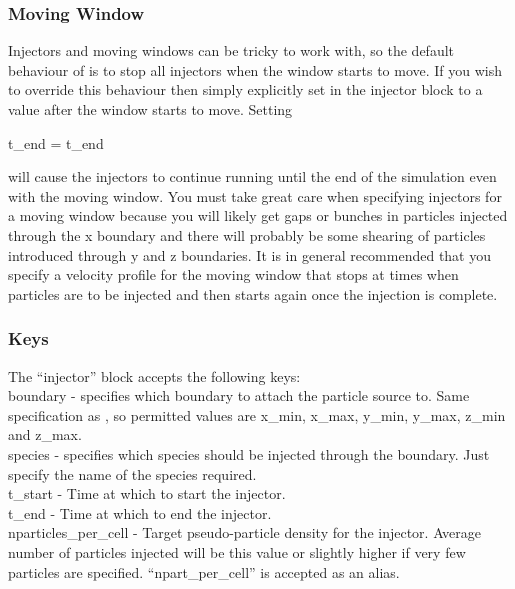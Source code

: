 \subsubsection{Moving Window}

Injectors and moving windows can be tricky to work with, so the default
behaviour of {\EPOCH} is to stop all injectors when the window starts to move.
If you wish to override this behaviour then simply explicitly set
 in the injector block to a value after the window starts
to move. Setting
\begin{boxverbatim}
t_end = t_end
\end{boxverbatim}
will cause the injectors to continue running until the end of the simulation
even with the moving window. You must take great care when specifying injectors
for a moving window because you will likely get gaps or bunches in particles
injected through the x boundary and there will probably be some shearing of
particles introduced through y and z boundaries. It is in general recommended
that you specify a velocity profile for the moving window that stops at times
when particles are to be injected and then starts again once the injection is
complete.

\subsubsection{Keys}

The ``injector'' block accepts the following keys:\\

{\emphtext boundary} - specifies which boundary to attach the particle source
  to. Same specification as , so permitted values are
  x\_min, x\_max, y\_min, y\_max, z\_min and z\_max.\\

{\emphtext species} - specifies which species should be injected through the
  boundary. Just specify the name of the species required.\\

{\emphtext t\_start} - Time at which to start the injector.\\

{\emphtext t\_end} - Time at which to end the injector.\\

{\emphtext nparticles\_per\_cell} - Target pseudo-particle density for the
  injector. Average number of particles injected will be this value or slightly
  higher if very few particles are specified. ``npart\_per\_cell'' is accepted
  as an alias.\\

